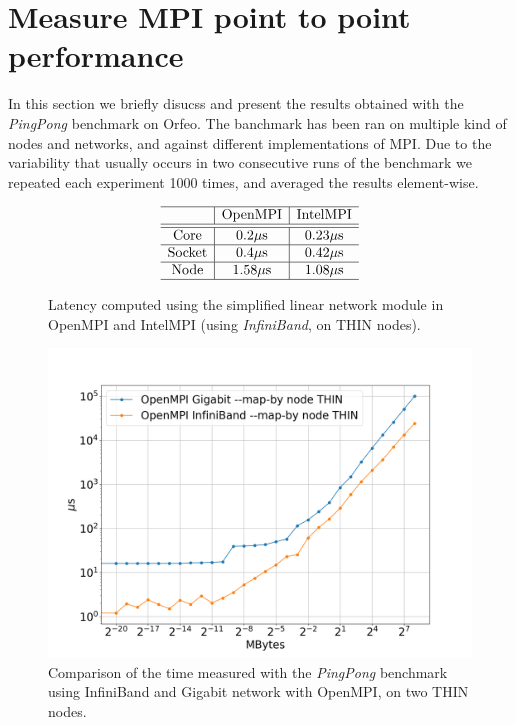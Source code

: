 \documentclass{article}
\begin{document}
\section{Measure MPI point to point performance}
In this section we briefly disucss and present the results obtained with the \emph{PingPong} benchmark on Orfeo. The banchmark has been ran on multiple kind of nodes and networks, and against different implementations of MPI. Due to the variability that usually occurs in two consecutive runs of the benchmark we repeated each experiment 1000 times, and averaged the results element-wise.

\begin{figure}[b!]
    $$
        \begin{array}{c | c | c} \hline
            & \text{OpenMPI} & \text{IntelMPI} \\ \hline
            \hline
            \text{Core} & 0.2 \mu \text{s}  & 0.23 \mu \text{s} \\ \hline
            \text{Socket} & 0.4 \mu \text{s}  & 0.42 \mu \text{s} \\ \hline
            \text{Node} & 1.58 \mu \text{s}  & 1.08 \mu \text{s} \\ \hline
        \end{array}
    $$
    \caption{Latency computed using the simplified linear network module in OpenMPI and IntelMPI (using \emph{InfiniBand}, on THIN nodes).}
    \label{tab:lat_ompi_intel}
\end{figure}

\begin{figure}[t!]
    \centering
    \includegraphics[width=\textwidth]{benchmark/infi_vs_giga_node.png}
    \caption{Comparison of the time measured with the \emph{PingPong} benchmark using InfiniBand and Gigabit network with OpenMPI, on two THIN nodes.}
    \label{fig:infi_vs_giga}
\end{figure}
\end{document}
